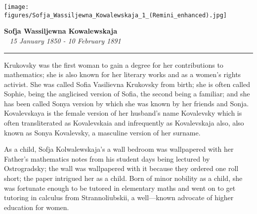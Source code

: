 \documentclass[12pt,a4paper]{article}
\begin{document}
\textcolor{UM_Brown}{
\begin{minipage}{0.1\textwidth}
    \begin{flushleft}
        \texttt{[image: figures/Sofja\_Wassiljewna\_Kowalewskaja\_1\_(Remini\_enhanced).jpg]}
    \end{flushleft}
\end{minipage}
\begin{minipage}{0.8\textwidth}
    \begin{center}
        \textbf{\Large Sofja Wassiljewna Kowalewskaja}\\
        \vspace{5pt}
       \
        \vspace{20pt}
        \textit{15 January 1850 - 10 February 1891} \\
        \vspace{}
    \end{center}
\end{minipage}
\vspace{10pt}
\hrule
}



\vspace{2cm}
Krukovsky was the first woman to gain a degree for her contributions to mathematics; she is also known for her literary works and as a women's rights activist. She was called Sofia Vasilievna Krukovsky from birth; she is often called Sophie, being the anglicised version of Sofia, the second being a familiar; and she has been called Sonya version by which she was known by her friends and Sonja. Kovalevskaya is the female version of her husband's name Kovalevsky which is often transliterated as Kovalevskaia and infrequently as Kovalevskaja also, also known as Sonya Kovalevsky, a masculine version of her surname.


As a child, Sofja Kolwalewskaja's a wall bedroom was wallpapered with her Father's mathematics notes from his student days being lectured by Ostrogradsky; the wall was wallpapered with it because they ordered one roll short; the paper intrigued her as a child. Born of minor nobility as a child, she was fortunate enough to be tutored in elementary maths and went on to get tutoring in calculus from  Strannoliubskii, a well---known advocate of higher education for women. 
\end{document}
